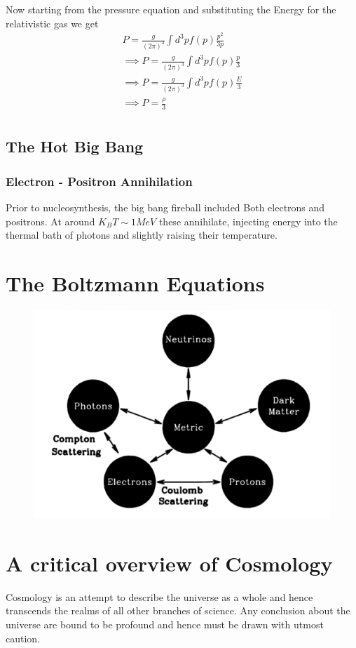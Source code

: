 \documentclass[12pt]{report}
\begin{document}
Now starting from the pressure equation and substituting the Energy for the relativistic gas we get
\begin{eqnarray*}
P=\frac{g}{(2 \pi)^3} \int d^3p f(p) \frac{p^2}{3p}\\
\implies P=\frac{g}{(2 \pi)^3} \int d^3p f(p) \frac{p}{3}\\
\implies P=\frac{g}{(2 \pi)^3} \int d^3p f(p) \frac{E}{3}\\
\implies P=\frac{\rho}{3}\\
\end{eqnarray*}
\section{The Hot Big Bang}
\subsection{Electron - Positron Annihilation}
Prior to nucleosynthesis, the big bang fireball included Both electrons and positrons. At around $K_BT \sim 1 MeV$ these annihilate, injecting energy into the thermal bath of photons and slightly raising their temperature.
\newpage
\chapter{The Boltzmann Equations}
\begin{figure}[h!]
\includegraphics[width=\linewidth]{intm.png}
\end{figure}
\chapter{A critical overview of Cosmology}
Cosmology is an attempt to describe the universe as a whole and hence transcends the realms of all other branches of science. Any conclusion about the universe are bound to be profound and hence must be drawn with utmost caution. 
\end{document}
